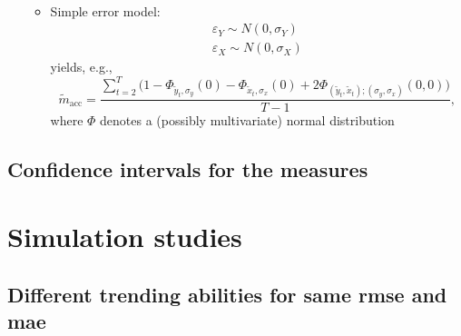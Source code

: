\documentclass[oneside]{article}
\theoremstyle{plain}%
\theoremstyle{definition}
\newcommand{\ydiff}{\tilde{y}}
\newcommand{\xdiff}{\tilde{x}}
\newcommand{\mprob}{\tilde{m}}
\begin{document}
\begin{itemize}
\begin{itemize}
\begin{align}
\end{align}
\item Simple error model:
  \begin{align}
	  \varepsilon_Y \sim N(0, \sigma_Y) \\
	  \varepsilon_X \sim N(0, \sigma_X)
  \end{align}
  yields, e.g.,
  	\begin{equation}
  		\mprob_{\text{acc}} = \frac{\sum_{t=2}^T  \big( 1 - \Phi_{\ydiff_t, \sigma_y}(0) - \Phi_{\xdiff_t, \sigma_x} (0) + 2 \Phi_{(\ydiff_t, \xdiff_t); (\sigma_y, \sigma_x)}( 0, 0) \big) }{T-1}, 
	\end{equation}
	where $\Phi$ denotes a (possibly multivariate) normal distribution
\end{itemize}
\end{itemize}


\subsection{Confidence intervals for the measures}

\section{Simulation studies}

\subsection{Different trending abilities for same rmse and mae} \label{sec:simulation_rmse_mae}
\end{document}
